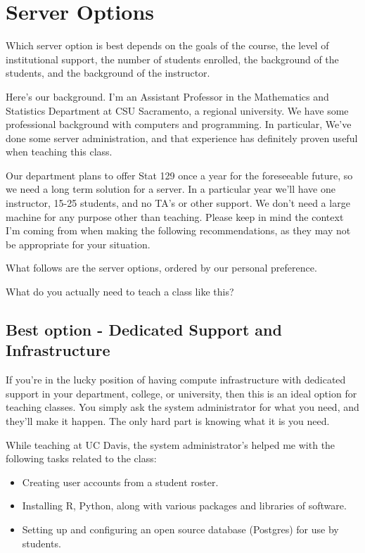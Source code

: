 \documentclass[12pt]{article}
\begin{document}
\section{Server Options}


Which server option is best depends on the goals of the course, the level of institutional support, the number of students enrolled, the background of the students, and the background of the instructor.


Here's our background.
I'm an Assistant Professor in the Mathematics and Statistics Department at CSU Sacramento, a regional university.
We have some professional background with computers and programming.
In particular, We've done some server administration, and that experience has definitely proven useful when teaching this class.


Our department plans to offer Stat 129 once a year for the foreseeable future, so we need a long term solution for a server.
In a particular year we'll have one instructor, 15-25 students, and no TA's or other support.
We don't need a large machine for any purpose other than teaching.
Please keep in mind the context I'm coming from when making the following recommendations, as they may not be appropriate for your situation.

What follows are the server options, ordered by our personal preference.

What do you actually need to teach a class like this?

\subsection{Best option - Dedicated Support and Infrastructure}

If you're in the lucky position of having compute infrastructure with dedicated support in your department, college, or university, then this is an ideal option for teaching classes.
You simply ask the system administrator for what you need, and they'll make it happen.
The only hard part is knowing what it is you need.

While teaching at UC Davis, the system administrator's helped me with the following tasks related to the class:
\begin{itemize}
\item Creating user accounts from a student roster.
\item Installing R, Python, along with various packages and libraries of software.
\item Setting up and configuring an open source database (Postgres) for use by students.
\end{itemize}
\end{document}
